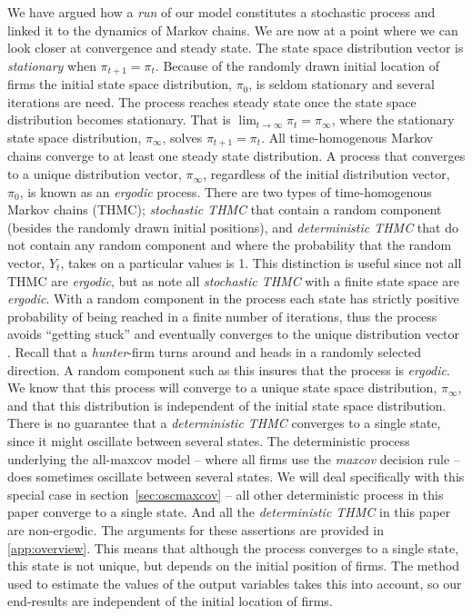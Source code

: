 \documentclass[preprint, 12pt]{elsarticle}
\begin{document}
We have argued how a \emph{run} of our model constitutes a stochastic process and linked it to the dynamics of Markov chains. We are now at a point where we can look closer at convergence and steady state. The state space distribution vector is \emph{stationary} when $\pi_{t+1} = \pi_t$. Because of the randomly drawn initial location of firms the initial state space distribution, $\pi_0$, is seldom stationary and several iterations are need. The process reaches steady state once the state space distribution becomes stationary. That is $\lim_{t \to \infty} \pi_t = \pi_\infty$, where the stationary state space distribution, $\pi_\infty$, solves $\pi_{t+1} = \pi_t$. All time-homogenous Markov chains converge to at least one steady state distribution. A process that converges to a unique distribution vector, $\pi_\infty$, regardless of the initial distribution vector, $\pi_0$, is known as an \emph{ergodic} process. There are two types of time-homogenous Markov chains (THMC); \emph{stochastic THMC} that contain a random component (besides the randomly drawn initial positions), and \emph{deterministic THMC} that do not contain any random component and where the probability that the random vector, $Y_t$, takes on a particular values is 1. This distinction is useful since not all THMC are \emph{ergodic}, but as \citet[chapter~4, p.~64]{Laver_Sergenti_2011} note all \emph{stochastic THMC} with a finite state space are \emph{ergodic}. With a random component in the process each state has strictly positive probability of being reached in a finite number of iterations, thus the process avoids ``getting stuck'' and eventually converges to the unique distribution vector \citep[chapter~4, p.~71]{Laver_Sergenti_2011}. Recall that a \emph{hunter}-firm turns around and heads in a randomly selected direction. A random component such as this insures that the process is \emph{ergodic}. We know that this process will converge to a unique state space distribution, $\pi_\infty$, and that this distribution is independent of the initial state space distribution. There is no guarantee that a \emph{deterministic THMC} converges to a single state, since it might oscillate between several states. The deterministic process underlying the all-maxcov model -- where all firms use the \emph{maxcov} decision rule -- does sometimes oscillate between several states. We will deal specifically with this special case in section~\ref{sec:oscmaxcov} -- all other deterministic process in this paper converge to a single state. And all the \emph{deterministic THMC} in this paper are non-ergodic. The arguments for these assertions are provided in \ref{app:overview}. This means that although the process converges to a single state, this state is not unique, but depends on the initial position of firms. The method used to estimate the values of the output variables takes this into account, so our end-results are independent of the initial location of firms.
\end{document}
